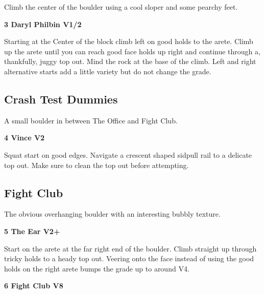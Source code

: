 \begin{multicols}{2}
			\begin{adjustwidth}{0.5cm}{}				
			Climb the center of the boulder using a cool sloper and some pearchy feet.
			\end{adjustwidth}

			\label{rt:Daryl Philbin}
\colorbox{green!20}{
\parbox{0.95\linewidth}{
\textbf{
3 Daryl Philbin V1/2  \warn
}
}
}

			\begin{adjustwidth}{0.5cm}{}				
			Starting at the Center of the block climb left on good holds to the arete. Climb up the arete until you can reach good face holds up right and continue through a, thankfully, juggy top out. Mind the rock at the base of the climb. Left and right alternative starts add a little variety but do not change the grade.
			\end{adjustwidth}
		\subsection*{Crash Test Dummies}\label{bf:Crash Test Dummies}
		A small boulder in between The Office and Fight Club.\\
	
			\label{rt:Vince}
\colorbox{green!20}{
\parbox{0.95\linewidth}{
\textbf{
4 Vince V2  
}
}
}

			\begin{adjustwidth}{0.5cm}{}				
			Squat start on good edges. Navigate a crescent shaped sidpull rail to a delicate top out. Make sure to clean the top out before attempting.
			\end{adjustwidth}
		\subsection*{Fight Club}\label{bf:Fight Club}
		The obvious overhanging boulder with an interesting bubbly texture.\\
	

			\label{rt:The Ear}
\colorbox{green!20}{
\parbox{0.95\linewidth}{
\textbf{
5 The Ear V2+  
}
}
}

			\begin{adjustwidth}{0.5cm}{}				
			Start on the arete at the far right end of the boulder. Climb straight up through tricky holds to a heady top out. Veering onto the face instead of using the good holds on the right arete bumps the grade up to around V4.
			\end{adjustwidth}
			\label{rt:Fight Club}
\colorbox{Goldenrod!50}{
\parbox{0.95\linewidth}{
\textbf{
6 Fight Club V8  
}
}
}


\end{multicols}

